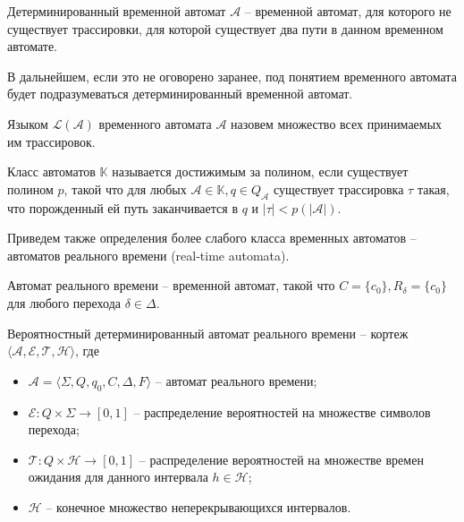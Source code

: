 \documentclass[times,specification,annotation]{itmo-student-thesis}
\begin{document}
\begin{definition}
  Детерминированный временной автомат $\mathcal{A}$ -- временной автомат, для которого не существует трассировки, для которой существует два пути в данном временном автомате.
  \label{DTA}
\end{definition}

В дальнейшем, если это не оговорено заранее, под понятием временного автомата будет подразумеваться детерминированный временной автомат.

\begin{definition}
  Языком $\mathcal{L}(\mathcal{A})$ временного автомата $\mathcal{A}$ назовем множество всех принимаемых им трассировок.
\end{definition}

\begin{definition}
  Класс автоматов $\mathbb{K}$ называется достижимым за полином, если существует полином $p$, такой что для любых
  $\mathcal{A} \in \mathbb{K}, q \in Q_{\mathcal{A}}$ существует трассировка $\tau$ такая, что порожденный ей путь заканчивается в $q$ и $|\tau| < p(|\mathcal{A}|)$.
\end{definition}

Приведем также определения более слабого класса временных автоматов -- автоматов реального времени (real-time automata).

\begin{definition}
  Автомат реального времени -- временной автомат, такой что $C = \{c_0\}, R_{\delta} = \{c_0\}$ для любого перехода $\delta \in \Delta$.
  \label{rti}
\end{definition}

\begin{definition}
  Вероятностный детерминированный автомат реального времени -- кортеж $\langle \mathcal{A}, \mathcal{E}, \mathcal{T}, \mathcal{H} \rangle$, где
  \begin{itemize}
    \item $\mathcal{A} = \langle \Sigma, Q, q_0, C, \Delta, F \rangle$ -- автомат реального времени;
    \item $\mathcal{E}: Q \times \Sigma \rightarrow [0, 1]$ -- распределение вероятностей на множестве символов перехода;
    \item $\mathcal{T}: Q \times \mathcal{H} \rightarrow [0, 1]$ -- распределение вероятностей на множестве времен ожидания для данного интервала $h \in \mathcal{H}$;
    \item $\mathcal{H}$ -- конечное множество неперекрывающихся интервалов.
  \end{itemize}
  \label{rti++}
\end{definition}
\end{document}
